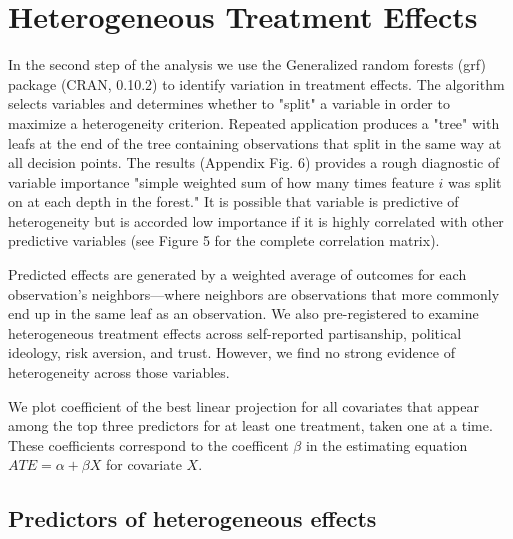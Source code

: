 \documentclass[12pt]{article}
\begin{document}



\clearpage
\section{Heterogeneous Treatment Effects}

In the second step of the analysis we use the Generalized random forests (grf) package (CRAN, 0.10.2) to identify variation in treatment effects. The algorithm selects variables and determines whether to "split" a variable in order to maximize a heterogeneity criterion. Repeated application produces a "tree" with leafs at the end of the tree containing observations that split in the same way at all decision points.  The results (Appendix Fig. 6) provides a rough diagnostic of variable importance "simple weighted sum of how many times feature $i$ was split on at each depth in the forest."  It is possible that variable is predictive of heterogeneity but is accorded low importance if it is highly correlated with other predictive variables (see Figure 5 for the complete correlation matrix).  

Predicted effects are generated by a weighted average of outcomes for each observation's neighbors---where neighbors are observations that more commonly end up in the same leaf as an observation. We also pre-registered to examine heterogeneous treatment effects across self-reported partisanship, political ideology, risk aversion, and trust. However, we find no strong evidence of heterogeneity across those variables. 

We plot coefficient of the best linear projection for all covariates that appear among the top three predictors for at least one treatment, taken one at a time. These coefficients correspond to the coefficent $\beta$ in the estimating equation $ATE = \alpha + \beta X$ for covariate $X$. 



\subsection{Predictors of heterogeneous effects}
\end{document}
